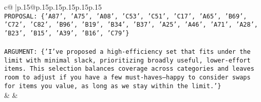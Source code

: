 \documentclass{article}
\begin{document}
{\begin{supertabular}{c@{$\;$}|p{.15\linewidth}@{}p{.15\linewidth}p{.15\linewidth}p{.15\linewidth}p{.15\linewidth}p{.15\linewidth}}
{{{\\ 
\texttt{PROPOSAL: \{'A87', 'A75', 'A08', 'C53', 'C51', 'C17', 'A65', 'B69', 'C72', 'C82', 'B96', 'B19', 'B34', 'B37', 'A25', 'A46', 'A71', 'A28', 'B23', 'B15', 'A39', 'B16', 'C79'\}} \\
\\ 
\texttt{ARGUMENT: \{'I’ve proposed a high{-}efficiency set that fits under the limit with minimal slack, prioritizing broadly useful, lower{-}effort items. This selection balances coverage across categories and leaves room to adjust if you have a few must{-}haves—happy to consider swaps for items you value, as long as we stay within the limit.'\}} \\
            }
        }
    }
    & & \\ \\


\end{supertabular}}
\end{document}
